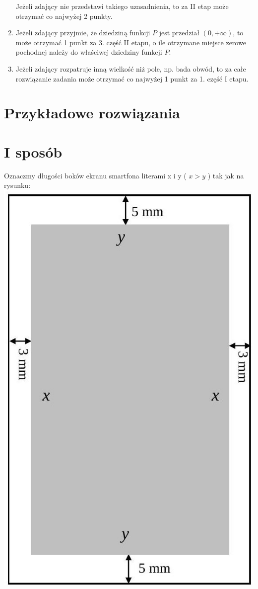 \documentclass[10pt]{article}
\begin{document}
\begin{enumerate}
Jeżeli zdający nie przedstawi takiego uzasadnienia, to za II etap może otrzymać co najwyżej 2 punkty.
  \item Jeżeli zdający przyjmie, że dziedziną funkcji $P$ jest przedział $(0,+\infty)$, to może otrzymać 1 punkt za 3. część II etapu, o ile otrzymane miejsce zerowe pochodnej należy do właściwej dziedziny funkcji $P$.
  \item Jeżeli zdający rozpatruje inną wielkość niż pole, np. bada obwód, to za całe rozwiązanie zadania może otrzymać co najwyżej 1 punkt za 1. część I etapu.
\end{enumerate}

\section*{Przykładowe rozwiązania}
\section*{I sposób}
Oznaczmy długości boków ekranu smartfona literami x i y ( $x>y$ ) tak jak na rysunku:\\
\includegraphics[max width=\textwidth, center]{2025_02_07_176452ab2cb6278af830g-37}
\end{document}
